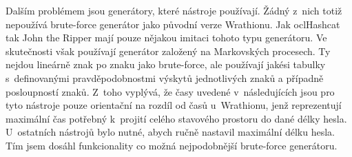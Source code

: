 Dalším problémem jsou generátory, které nástroje používají. Žádný z~nich totiž nepoužívá
 brute-force generátor jako původní verze Wrathionu. Jak oclHashcat tak John the
Ripper mají pouze nějakou imitaci tohoto typu generátoru. Ve skutečnosti však používají generátor
založený na Markovských procesech. Ty nejdou lineárně znak po znaku jako brute-force, ale
používají jakési tabulky s~definovanými pravděpodobnostmi výskytů jednotlivých znaků a případně
posloupností znaků. Z~toho vyplývá, že časy uvedené v~následujících jsou pro tyto nástroje pouze
orientační na rozdíl od časů u~Wrathionu, jenž reprezentují maximální čas potřebný k~projití
celého stavového prostoru do dané délky hesla. U~ostatních nástrojů bylo nutné, abych ručně
nastavil maximální délku hesla. Tím jsem dosáhl funkcionality co možná nejpodobnější brute-force
generátoru.
\shorthandoff{-}
